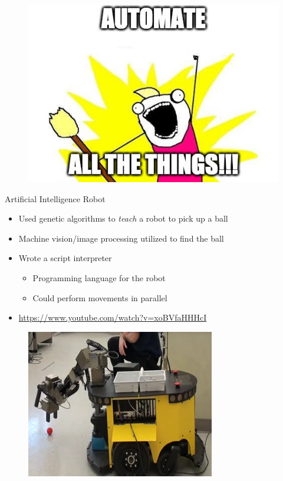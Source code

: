 \documentclass{beamer}
\begin{document}
\begin{frame}
\begin{figure}
	\includegraphics[width=\linewidth]{img/all_the_things.jpg}
\end{figure}
\end{frame}

\begin{frame}{Artificial Intelligence Robot}
\begin{itemize}
	\item Used genetic algorithms to \emph{teach} a robot to pick up a ball
	\item Machine vision/image processing utilized to find the ball
	\item Wrote a script interpreter
	\begin{itemize}
		\item Programming language for the robot
		\item Could perform movements in parallel
	\end{itemize}
	\item \url{https://www.youtube.com/watch?v=xoBVfaHHHcI}
\end{itemize}
\begin{figure}
	\includegraphics[width=.45\linewidth]{img/robot.png}
\end{figure}
\end{frame}
\end{document}
